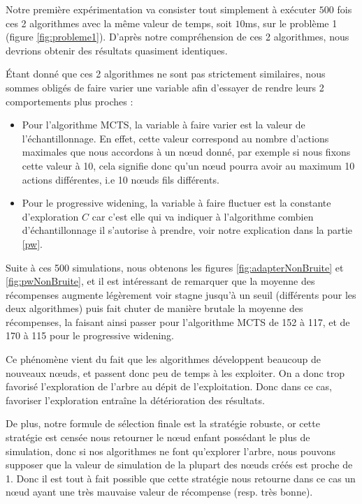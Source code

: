 \documentclass[pdftex,french, english]{article}	%
\begin{document}
    Notre première expérimentation va consister tout simplement à exécuter $500$ fois ces 2 algorithmes avec la même valeur de temps, soit $10$ms, sur le problème 1 (figure \ref{fig:probleme1}). D'après notre compréhension de ces 2 algorithmes, nous devrions obtenir des résultats quasiment identiques.
    
    Étant donné que ces 2 algorithmes ne sont pas strictement similaires, nous sommes obligés de faire varier une variable afin d'essayer de rendre leurs 2 comportements plus proches :
\begin{itemize}
\item Pour l'algorithme MCTS, la variable à faire varier est la valeur de l'échantillonnage. En effet, cette valeur correspond au nombre d'actions maximales que nous accordons à un nœud donné, par exemple si nous fixons cette valeur à 10, cela signifie donc qu'un nœud pourra avoir au maximum 10 actions différentes, i.e 10 nœuds fils différents.
\item Pour le progressive widening, la variable à faire fluctuer est la constante d'exploration $C$ car c'est elle qui va indiquer à l'algorithme combien d'échantillonnage il s’autorise à prendre, voir notre explication dans la partie \ref{pw}.
\end{itemize}
    
    Suite à ces 500 simulations, nous obtenons les figures \ref{fig:adapterNonBruite} et \ref{fig:pwNonBruite}, et il est intéressant de remarquer que la moyenne des récompenses augmente légèrement voir stagne jusqu'à un seuil (différents pour les deux algorithmes) puis fait chuter de manière brutale la moyenne des récompenses, la faisant ainsi passer pour l'algorithme MCTS de 152 à 117, et de 170 à 115 pour le progressive widening. 
    
    Ce phénomène vient du fait que les algorithmes développent beaucoup de nouveaux nœuds, et passent donc peu de temps à les exploiter. On a donc trop favorisé l'exploration de l'arbre au dépit de l'exploitation. Donc dans ce cas, favoriser l'exploration entraîne la détérioration des résultats.
    
    De plus, notre formule de sélection finale est la stratégie robuste, or cette stratégie est censée nous retourner le nœud enfant possédant le plus de simulation, donc si nos algorithmes ne font qu'explorer l'arbre, nous pouvons supposer que la valeur de simulation de la plupart des nœuds créés est proche de 1. Donc il est tout à fait possible que cette stratégie nous retourne dans ce cas un nœud ayant une très mauvaise valeur de récompense (resp. très bonne).
    
\end{document}
